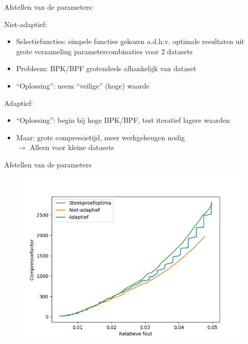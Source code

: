 \documentclass[t,12pt,dutch
\ifx\beamermode\undefined\else,\beamermode\fi
]{beamer}
\begin{document}
\begin{frame}{Afstellen van de parameters: }

Niet-adaptief:
\begin{itemize}
\item Selectiefuncties: simpele functies gekozen a.d.h.v. optimale resultaten uit grote verzameling parametercombinaties voor 2 datasets
\item Probleem: BPK/BPF grotendeels afhankelijk van dataset
\item ``Oplossing'': neem ``veilige'' (hoge) waarde
\end{itemize}

Adaptief:
\begin{itemize}
\item ``Oplossing'': begin bij hoge BPK/BPF, test iteratief lagere waarden
\item Maar: grote compressietijd, meer werkgeheugen nodig\\
$\rightarrow$ Alleen voor kleine datasets
\end{itemize}

\end{frame}

\begin{frame}{Afstellen van de parameters}

\begin{figure}[H]
\centering
\includegraphics[scale=0.5]{images/parameter_functions_results_including_adaptive_Cuprite.png}
\end{figure}

\end{frame}
\end{document}

